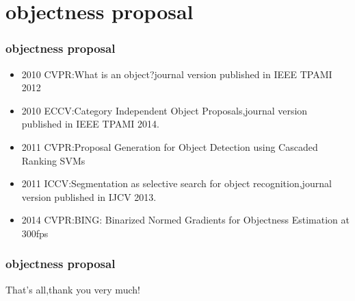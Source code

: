 \documentclass[notheorems,mathserif,table,compress]{beamer}  %
\begin{document}
\section{objectness proposal}

\begin{frame} 
  \frametitle{objectness proposal}
  \begin{itemize}
  \item 2010 CVPR:What is an object?journal version published in IEEE TPAMI 2012
  \item 2010 ECCV:Category Independent Object Proposals,journal version published in IEEE TPAMI 2014.
  \item 2011 CVPR:Proposal Generation for Object Detection using Cascaded Ranking SVMs
  \item 2011 ICCV:Segmentation as selective search for object recognition,journal version published in IJCV 2013.
  \item 2014 CVPR:BING: Binarized Normed Gradients for Objectness Estimation at 300fps
  \end{itemize}
\end{frame}%

\begin{frame} 
  \frametitle{objectness proposal}
That's all,thank you very much!
\end{frame}
\end{document}
